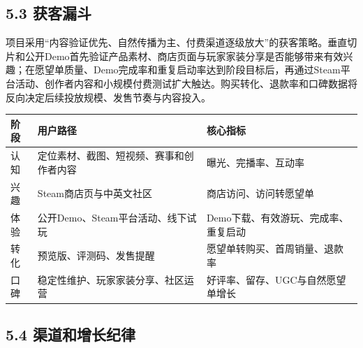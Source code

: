 \documentclass[UTF8,fontset=none,zihao=5,twoside]{ctexart}
\newcounter{none}
\newenvironment{BusinessTable}{%
  \begingroup
  \small
  \setlength{\parindent}{0pt}%
  \setlength{\parskip}{0pt}%
  \rowcolors{2}{TableAlt}{white}%
}{%
  \endgroup
}
\begin{document}
\subsection{5.3 获客漏斗}\label{53-ux83b7ux5ba2ux6f0fux6597}

项目采用``内容验证优先、自然传播为主、付费渠道逐级放大''的获客策略。垂直切片和公开Demo首先验证产品素材、商店页面与玩家家装分享是否能够带来有效兴趣；在愿望单质量、Demo完成率和重复启动率达到阶段目标后，再通过Steam平台活动、创作者内容和小规模付费测试扩大触达。购买转化、退款率和口碑数据将反向决定后续投放规模、发售节奏与内容投入。

\begin{BusinessTable}

{\def\LTcaptype{none} %
\begin{longtable}[]{@{}
  >{\raggedright\arraybackslash}p{}
  >{\raggedright\arraybackslash}p{}
  >{\raggedright\arraybackslash}p{}@{}}
\toprule\noalign{}
\begin{minipage}[b]{\linewidth}\raggedright
\cellcolor{TableHeader}\color{BrandBlue}\bfseries 阶段
\end{minipage} & \begin{minipage}[b]{\linewidth}\raggedright
\cellcolor{TableHeader}\color{BrandBlue}\bfseries 用户路径
\end{minipage} & \begin{minipage}[b]{\linewidth}\raggedright
\cellcolor{TableHeader}\color{BrandBlue}\bfseries 核心指标
\end{minipage} \\
\midrule\noalign{}
\endhead
\bottomrule\noalign{}
\endlastfoot
认知 & 定位素材、截图、短视频、赛事和创作者内容 & 曝光、完播率、互动率 \\
兴趣 & Steam商店页与中英文社区 & 商店访问、访问转愿望单 \\
体验 & 公开Demo、Steam平台活动、线下试玩 & Demo下载、有效游玩、完成率、重复启动 \\
转化 & 预览版、评测码、发售提醒 & 愿望单转购买、首周销量、退款率 \\
口碑 & 稳定性维护、玩家家装分享、社区运营 & 好评率、留存、UGC与自然愿望单增长 \\
\end{longtable}
}

\end{BusinessTable}

\subsection{5.4 渠道和增长纪律}\label{54-ux6e20ux9053ux548cux589eux957fux7eaaux5f8b}
\end{document}

